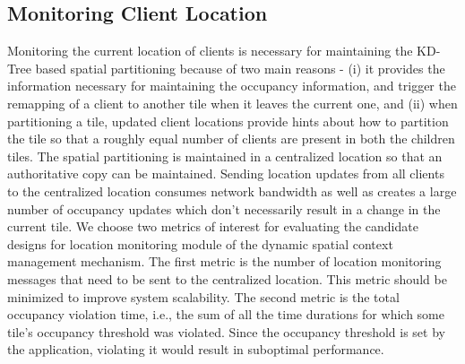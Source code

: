 \subsection{Monitoring Client Location}
Monitoring the current location of clients is necessary for maintaining the KD-Tree based spatial partitioning because of two main reasons - (i) it provides the information necessary for maintaining the occupancy information, and trigger the remapping of a client to another tile when it leaves the current one, and (ii) when partitioning a tile, updated client locations provide hints about how to partition the tile so that a roughly equal number of clients are present in both the children tiles.
The spatial partitioning is maintained in a centralized location so that an authoritative copy can be maintained. Sending location updates from all clients to the centralized location consumes network bandwidth as well as creates a large number of occupancy updates which don't necessarily result in a change in the current tile. 
We choose two metrics of interest for evaluating the candidate designs for location monitoring module of the dynamic spatial context management mechanism. The first metric is the number of location monitoring messages that need to be sent to the centralized location. This metric should be minimized to improve system scalability. The second metric is the total occupancy violation time, i.e., the sum of all the time durations for which some tile's occupancy threshold was violated. Since the occupancy threshold is set by the application, violating it would result in suboptimal performance.

